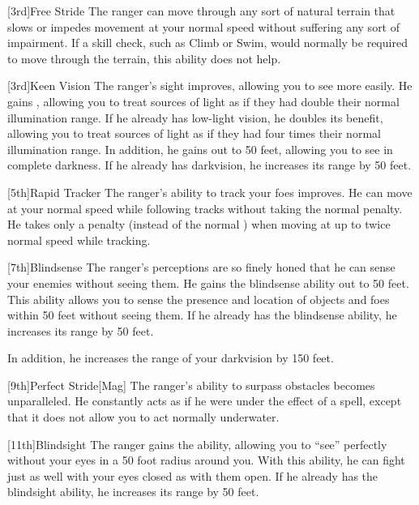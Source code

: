         [3rd]{Free Stride}
        The ranger can move through any sort of natural terrain that slows or impedes movement at your normal speed without suffering any sort of impairment.
        If a skill check, such as Climb or Swim, would normally be required to move through the terrain, this ability does not help.

        [3rd]{Keen Vision}
        The ranger's sight improves, allowing you to see more easily.
        He gains , allowing you to treat sources of light as if they had double their normal illumination range.
        If he already has low-light vision, he doubles its benefit, allowing you to treat sources of light as if they had four times their normal illumination range.
        In addition, he gains  out to 50 feet, allowing you to see in complete darkness.
        If he already has darkvision, he increases its range by 50 feet.

        [5th]{Rapid Tracker}
        The ranger's ability to track your foes improves.
        He can move at your normal speed while following tracks without taking the normal  penalty.
        He takes only a  penalty (instead of the normal ) when moving at up to twice normal speed while tracking.

        [7th]{Blindsense}
        The ranger's perceptions are so finely honed that he can sense your enemies without seeing them.
        He gains the blindsense ability out to 50 feet.
        This ability allows you to sense the presence and location of objects and foes within 50 feet without seeing them.
        If he already has the blindsense ability, he increases its range by 50 feet.

        In addition, he increases the range of your darkvision by 150 feet.

        [9th]{Perfect Stride}[Mag]
        The ranger's ability to surpass obstacles becomes unparalleled.
        He constantly acts as if he were under the effect of a  spell, except that it does not allow you to act normally underwater.

        [11th]{Blindsight}
        The ranger gains the  ability, allowing you to ``see'' perfectly without your eyes in a 50 foot radius around you.
        With this ability, he can fight just as well with your eyes closed as with them open.
        If he already has the blindsight ability, he increases its range by 50 feet.

